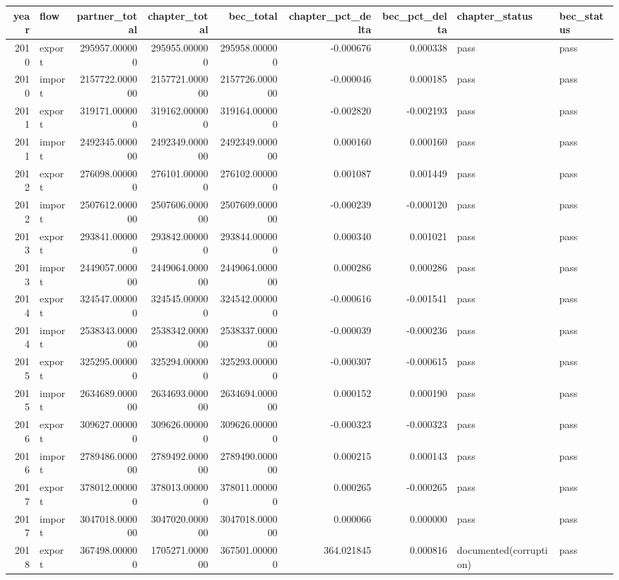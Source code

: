 \begin{tabular}{rlrrrrrll}
\toprule
year & flow & partner_total & chapter_total & bec_total & chapter_pct_delta & bec_pct_delta & chapter_status & bec_status \\
\midrule
2010 & export & 295957.000000 & 295955.000000 & 295958.000000 & -0.000676 & 0.000338 & pass & pass \\
2010 & import & 2157722.000000 & 2157721.000000 & 2157726.000000 & -0.000046 & 0.000185 & pass & pass \\
2011 & export & 319171.000000 & 319162.000000 & 319164.000000 & -0.002820 & -0.002193 & pass & pass \\
2011 & import & 2492345.000000 & 2492349.000000 & 2492349.000000 & 0.000160 & 0.000160 & pass & pass \\
2012 & export & 276098.000000 & 276101.000000 & 276102.000000 & 0.001087 & 0.001449 & pass & pass \\
2012 & import & 2507612.000000 & 2507606.000000 & 2507609.000000 & -0.000239 & -0.000120 & pass & pass \\
2013 & export & 293841.000000 & 293842.000000 & 293844.000000 & 0.000340 & 0.001021 & pass & pass \\
2013 & import & 2449057.000000 & 2449064.000000 & 2449064.000000 & 0.000286 & 0.000286 & pass & pass \\
2014 & export & 324547.000000 & 324545.000000 & 324542.000000 & -0.000616 & -0.001541 & pass & pass \\
2014 & import & 2538343.000000 & 2538342.000000 & 2538337.000000 & -0.000039 & -0.000236 & pass & pass \\
2015 & export & 325295.000000 & 325294.000000 & 325293.000000 & -0.000307 & -0.000615 & pass & pass \\
2015 & import & 2634689.000000 & 2634693.000000 & 2634694.000000 & 0.000152 & 0.000190 & pass & pass \\
2016 & export & 309627.000000 & 309626.000000 & 309626.000000 & -0.000323 & -0.000323 & pass & pass \\
2016 & import & 2789486.000000 & 2789492.000000 & 2789490.000000 & 0.000215 & 0.000143 & pass & pass \\
2017 & export & 378012.000000 & 378013.000000 & 378011.000000 & 0.000265 & -0.000265 & pass & pass \\
2017 & import & 3047018.000000 & 3047020.000000 & 3047018.000000 & 0.000066 & 0.000000 & pass & pass \\
2018 & export & 367498.000000 & 1705271.000000 & 367501.000000 & 364.021845 & 0.000816 & documented(corruption) & pass \\

\end{tabular}
